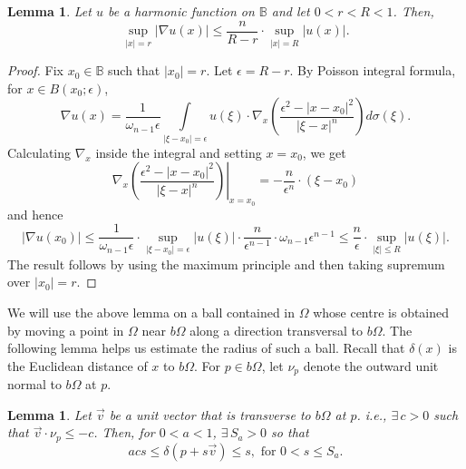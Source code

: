\documentclass[12pt,a4paper]{amsart}
\numberwithin{equation}{section}
\newtheorem{lemma}[equation]{Lemma}
\theoremstyle{definition}
\begin{document}
\begin{lemma}\label{lemma:HarEst} Let $u$ be a harmonic function on $\mathbb{B}$ and let $0<r<R<1$. Then,
    \[\sup\limits_{{\left\lvert{x}\right\rvert}=r} {\left\lvert{\nabla u(x)}\right\rvert} \le \frac{n}{R-r} \cdot \sup\limits_{{\left\lvert{x}\right\rvert}=R} {\left\lvert{u(x)}\right\rvert}.\]
\end{lemma}
\begin{proof} Fix $x_0\in \mathbb{B}$ such that ${\left\lvert{x_0}\right\rvert}=r$. Let $\epsilon=R-r$. By Poisson integral formula, for $x\in B(x_0;\epsilon)$, 
\[\nabla u(x) = \frac{1}{\omega_{n-1} \epsilon} \int\limits_{{\left\lvert{\xi-x_0}\right\rvert}=\epsilon} u(\xi) \cdot \nabla_x \left(\frac{\epsilon^2 - {\left\lvert{x-x_0}\right\rvert}^2}{{\left\lvert{\xi-x}\right\rvert}^n} \right) d\sigma(\xi).\]
Calculating $\nabla_x$ inside the integral and setting $x=x_0$, we get
\[\left.\nabla_x \left(\frac{\epsilon^2 - {\left\lvert{x-x_0}\right\rvert}^2}{{\left\lvert{\xi-x}\right\rvert}^n} \right)\right|_{x=x_0} = -\frac{n}{\epsilon^{n}}\cdot (\xi-x_0)\]
and hence
\[ {\left\lvert{\nabla u(x_0)}\right\rvert} \le \frac{1}{\omega_{n-1}\epsilon}\cdot\sup\limits_{{\left\lvert{\xi-x_0}\right\rvert}=\epsilon}{\left\lvert{u(\xi)}\right\rvert} \cdot \frac{n}{\epsilon^{n-1}} \cdot \omega_{n-1}\epsilon^{n-1} \le \frac{n}{\epsilon}\cdot\sup\limits_{{\left\lvert{\xi}\right\rvert}\le R}{\left\lvert{u(\xi)}\right\rvert}.\]
The result follows by using the maximum principle and then taking supremum over ${\left\lvert{x_0}\right\rvert}=r$.
\end{proof}

We will use the above lemma on a ball contained in $\Omega$ whose centre is obtained by moving a point in $\Omega$ near $b\Omega$ along a direction transversal to $b\Omega$. The following 
lemma helps us estimate the radius of such a ball. Recall that $\delta(x)$ is the Euclidean distance of $x$ to $b\Omega$. For $p\in b\Omega$, let $\nu_p$ denote the outward unit normal to $b\Omega$ at 
$p$.

\begin{lemma}\label{lemma:TransDistEst}
Let $\vec{v}$ be a unit vector that is transverse to $b\Omega$ at $p$. i.e., $\exists\, c>0$ such that $ \vec{v}\cdot\nu_p \le -c$.
Then, for $0<a<1$, $\exists\, S_a>0$ so that
		\[acs \le \delta\left(p+s\vec{v}\right) \le s, \text{ for } 0 < s \le S_a.\]
\end{lemma}
\end{document}
